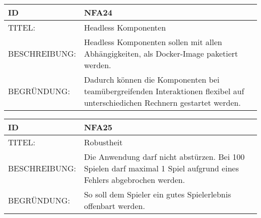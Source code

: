 \documentclass{uulm-assignment}
\begin{document}
    \begin{tabularx}{\textwidth}{|l|X |} \hline
        \textbf{ID} & \textbf{NFA24} \\
        \hline
        TITEL: & Headless Komponenten\\
        \hline
        BESCHREIBUNG: & Headless Komponenten sollen mit allen Abhängigkeiten, als Docker-Image paketiert werden.\\
        \hline
        BEGRÜNDUNG: & Dadurch können die Komponenten bei teamübergreifenden Interaktionen flexibel auf unterschiedichen Rechnern gestartet werden.\\
        \hline
    \end{tabularx}

    \begin{tabularx}{\textwidth}{|l|X |} \hline
        \textbf{ID} & \textbf{NFA25} \\
        \hline
        TITEL: & Robustheit \\
        \hline
        BESCHREIBUNG: & Die Anwendung darf nicht abstürzen. Bei 100 Spielen darf maximal 1 Spiel
        aufgrund eines Fehlers abgebrochen werden. \\
        \hline
        BEGRÜNDUNG: & So soll dem Spieler ein gutes Spielerlebnis offenbart werden. \\
        \hline
    \end{tabularx}
    
\end{document}
